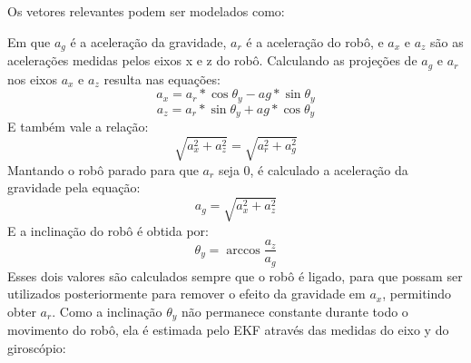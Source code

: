 \documentclass[
	12pt,				%
	openright,			%
	twoside,			%
	convert,
	a4paper,			%
	english,			%
	french,				%
	spanish,			%
	brazil				%
	]{abntex2}
\begin{document}
Os vetores relevantes podem ser modelados como:
\begin{center}
\end{center}
Em que $a_g$ é a aceleração da gravidade, $a_r$ é a aceleração do robô, e $a_x$ e $a_z$ são as acelerações medidas pelos eixos x e z do robô.
Calculando as projeções de $a_g$ e $a_r$ nos eixos $a_x$ e $a_z$ resulta nas equações:
\begin{equation}
	a_x = a_r * \cos{\theta_y} - ag * \sin{\theta_y}
\end{equation}
\begin{equation}
	a_z = a_r * \sin{\theta_y} + ag * \cos{\theta_y}
\end{equation}
E também vale a relação:
\begin{equation}
	\sqrt{a_x^2 + a_z^2} = \sqrt{a_r^2 + a_g^2}
\end{equation}
Mantando o robô parado para que $a_r$ seja 0, é calculado a aceleração da gravidade pela equação:
\begin{equation}
	a_g = \sqrt{a_x^2 + a_z^2}
\end{equation}
E a inclinação do robô é obtida por:
\begin{equation}
	\theta_y = \arccos{\frac{a_z}{a_g}}
\end{equation}
Esses dois valores são calculados sempre que o robô é ligado, para que possam ser utilizados posteriormente para remover o efeito da gravidade em $a_x$, permitindo obter $a_r$. Como a inclinação $\theta_y$ não permanece constante durante todo o movimento do robô, ela é estimada pelo EKF através das medidas do eixo y do giroscópio:
\end{document}
